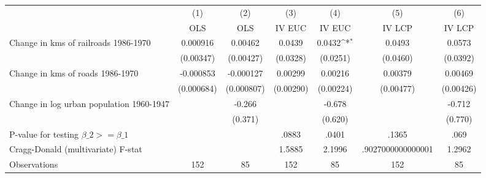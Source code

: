 {
\def\sym#1{\ifmmode^{#1}\else\(^{#1}\)\fi}
\begin{tabular}{l*{6}{c}}
\hline\hline
                &\multicolumn{1}{c}{(1)}&\multicolumn{1}{c}{(2)}&\multicolumn{1}{c}{(3)}&\multicolumn{1}{c}{(4)}&\multicolumn{1}{c}{(5)}&\multicolumn{1}{c}{(6)}\\
                &\multicolumn{1}{c}{OLS}&\multicolumn{1}{c}{OLS}&\multicolumn{1}{c}{IV EUC}&\multicolumn{1}{c}{IV EUC}&\multicolumn{1}{c}{IV LCP}&\multicolumn{1}{c}{IV LCP}\\
\hline
Change in kms of railroads 1986-1970& 0.000916         &  0.00462         &   0.0439         &   0.0432\sym{*}  &   0.0493         &   0.0573         \\
                &(0.00347)         &(0.00427)         & (0.0328)         & (0.0251)         & (0.0460)         & (0.0392)         \\
[1em]
Change in kms of roads 1986-1970&-0.000853         &-0.000127         &  0.00299         &  0.00216         &  0.00379         &  0.00469         \\
                &(0.000684)         &(0.000807)         &(0.00290)         &(0.00224)         &(0.00477)         &(0.00426)         \\
[1em]
Change in log urban population 1960-1947&                  &   -0.266         &                  &   -0.678         &                  &   -0.712         \\
                &                  &  (0.371)         &                  &  (0.620)         &                  &  (0.770)         \\
\hline
P-value for testing $\beta\_{2} >= \beta\_{1}$&                  &                  &    .0883         &    .0401         &    .1365         &     .069         \\
Cragg-Donald (multivariate) F-stat&                  &                  &   1.5885         &   2.1996         &.9027000000000001         &   1.2962         \\
Observations    &      152         &       85         &      152         &       85         &      152         &       85         \\
\hline\hline
\end{tabular}
}
